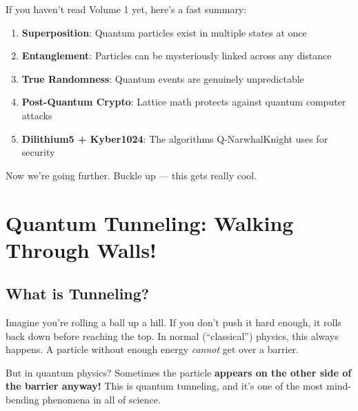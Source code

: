 \documentclass[11pt,a4paper]{article}
\begin{document}
If you haven't read Volume 1 yet, here's a fast summary:

\begin{tcolorbox}[colback=brightgreen!10,colframe=brightgreen,title=\textbf{Volume 1 Key Ideas}]
\begin{enumerate}
    \item \textbf{Superposition}: Quantum particles exist in multiple states at once
    \item \textbf{Entanglement}: Particles can be mysteriously linked across any distance
    \item \textbf{True Randomness}: Quantum events are genuinely unpredictable
    \item \textbf{Post-Quantum Crypto}: Lattice math protects against quantum computer attacks
    \item \textbf{Dilithium5 + Kyber1024}: The algorithms Q-NarwhalKnight uses for security
\end{enumerate}
\end{tcolorbox}

Now we're going further. Buckle up --- this gets really cool.

\section{Quantum Tunneling: Walking Through Walls!}

\subsection{What is Tunneling?}

Imagine you're rolling a ball up a hill. If you don't push it hard enough, it rolls back down before reaching the top. In normal (``classical'') physics, this always happens. A particle without enough energy \textit{cannot} get over a barrier.

But in quantum physics? Sometimes the particle \textbf{appears on the other side of the barrier anyway!} This is quantum tunneling, and it's one of the most mind-bending phenomena in all of science.
\end{document}
